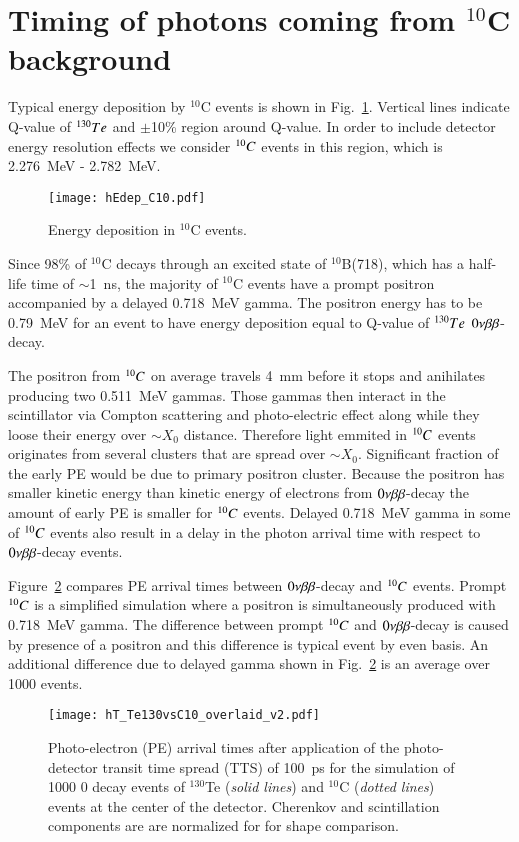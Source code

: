 \section{Timing of photons coming from $^{10}$C background}

Typical energy deposition by $^{10}$C events is shown in
Fig.~\ref{fig:Edep_C10}. Vertical lines indicate Q-value of $^{130}Te$ and 
$\pm$10\% region around Q-value. In order to include detector energy resolution 
effects we consider $^{10}C$ events in this region, which is 2.276~MeV - 2.782~MeV.


\begin{figure}[h]
  \centering
  \texttt{[image: hEdep\_C10.pdf]}
  \caption{Energy deposition in $^{10}$C events.}
  \label{fig:Edep_C10}
\end{figure}

Since 98\% of $^{10}$C decays through an excited state of $^{10}$B(718), 
which has a half-life time of $\sim$1~ns, the majority of $^{10}$C events have 
a prompt positron accompanied by a delayed 0.718~MeV gamma. The positron energy
has to be 0.79~MeV for an event to have energy deposition equal to Q-value of
$^{130}Te$ $0\nu\beta\beta$-decay.

The positron from $^{10}C$ on average travels 4~mm before it stops and anihilates
producing two 0.511~MeV gammas. Those gammas then interact in the scintillator via 
Compton scattering and photo-electric effect along while they loose their energy
over $\sim X_0$ distance. Therefore light emmited in $^{10}C$ events originates from
several clusters that are spread over $\sim X_0$. Significant fraction of the 
early PE would be due to primary positron cluster. Because the positron has smaller 
kinetic energy than kinetic energy of electrons from $0\nu\beta\beta$-decay the amount of early 
PE is smaller for $^{10}C$ events. Delayed 0.718~MeV gamma in some of $^{10}C$ events 
also result in a delay in the photon arrival time with respect to $0\nu\beta\beta$-decay events.

Figure~\ref{fig:Arrival_time_C10_overlaid} compares PE arrival times between 
$0\nu\beta\beta$-decay and $^{10}C$ events. Prompt $^{10}C$ is a simplified simulation where 
a positron is simultaneously produced with 0.718~MeV gamma. The difference between
prompt $^{10}C$ and $0\nu\beta\beta$-decay is caused by presence of a positron and this 
difference is typical event by even basis. An additional difference due to delayed
gamma shown in Fig.~\ref{fig:Arrival_time_C10_overlaid} is an average over 1000 events.

\begin{figure}[h]
  \centering
  \texttt{[image: hT\_Te130vsC10\_overlaid\_v2.pdf]}
  \caption{Photo-electron (PE) arrival times after application of the
    photo-detector transit time spread (TTS) of 100~ps for the
    simulation of 1000 0{\nbb} decay events of $^{130}$Te (\emph{solid
      lines}) and $^{10}$C (\emph{dotted lines}) events at the center
    of the detector. Cherenkov and scintillation components are are normalized for 
    for shape comparison.}
\label{fig:Arrival_time_C10_overlaid}
\end{figure}

